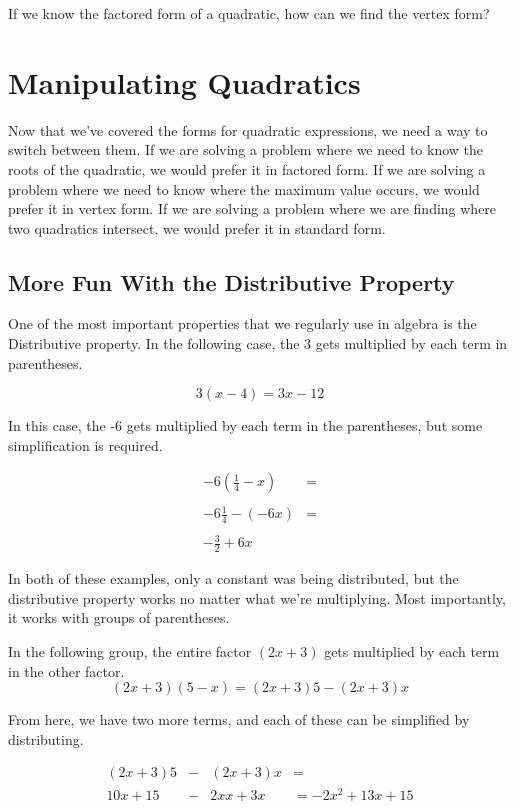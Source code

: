 \begin{prblm}
If we know the factored form of a quadratic, how can we find the vertex form?
\end{prblm}

\section*{Manipulating Quadratics}

Now that we've covered the forms for quadratic expressions, we need a way to switch between them.  If we are solving a problem where we need to know the roots of the quadratic, we would prefer it in factored form.  If we are solving a problem where we need to know where the maximum value occurs, we would prefer it in vertex form.  If we are solving a problem where we are finding where two quadratics intersect, we would prefer it in standard form.

\subsection*{More Fun With the Distributive Property}

One of the most important properties that we regularly use in algebra is the Distributive property.  In the following case, the 3 gets multiplied by each term in parentheses.

$$3(x-4) = 3x - 12$$

In this case, the -6 gets multiplied by each term in the parentheses, but some simplification is required.

$$\begin{array}{rl}
-6(\frac{1}{4}- x) & = \\ & \\
-6\frac{1}{4} -(-6x) & = \\ & \\
-\frac{3}{2} + 6x\end{array}$$

In both of these examples, only a constant was being distributed, but the distributive property works no matter what we're multiplying.  Most importantly, it works with groups of parentheses.

\begin{example}

In the following group, the entire factor $(2x + 3)$ gets multiplied by each term in the other factor.
$$(2x + 3)(5-x) = (2x+3)5 - (2x+3)x$$

From here, we have two more terms, and each of these can be simplified by distributing.

$$\begin{array}{rcll}
(2x + 3)5 & - & (2x + 3)x & = \\
10x+15 & - & 2xx+3x & = -2x^2 + 13x + 15\end{array}$$
\end{example}

